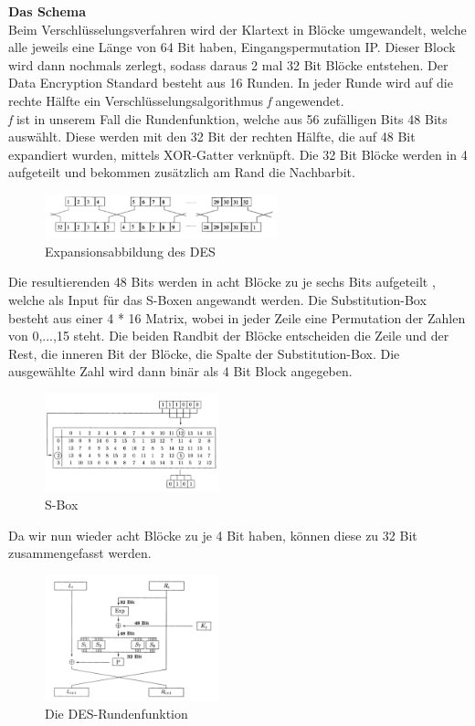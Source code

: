 \documentclass[11pt]{scrartcl}
\begin{document}
\noindent \textbf{Das Schema}\\
Beim Verschlüsselungsverfahren wird der Klartext in Blöcke umgewandelt, welche alle jeweils eine Länge von 64 Bit haben, Eingangspermutation IP. Dieser Block wird dann nochmals zerlegt, sodass daraus 2 mal 32 Bit Blöcke entstehen. Der Data Encryption Standard besteht aus 16 Runden. In jeder Runde wird auf die rechte Hälfte ein Verschlüsselungsalgorithmus \textit{f} angewendet.\\
\textit{f} ist in unserem Fall die Rundenfunktion, welche aus 56 zufälligen Bits 48 Bits auswählt. Diese werden mit den 32 Bit der rechten Hälfte, die auf 48 Bit expandiert wurden, mittels XOR-Gatter verknüpft. Die 32 Bit Blöcke werden in 4 aufgeteilt und bekommen zusätzlich am Rand die Nachbarbit. \\
\begin{figure}[H]
\includegraphics[width=0.60\textwidth]{Bilder/DES/DES_Expansionsabbildung}
	\caption{Expansionsabbildung des DES \citep{2}}
	\label{fig1}
\end{figure}
\noindent \grqq{}Die resultierenden 48 Bits werden in acht Blöcke zu je sechs Bits aufgeteilt\grqq{} \cite{2}, welche als Input für das S-Boxen angewandt werden. Die Substitution-Box besteht aus einer 4 * 16 Matrix, \grqq{}wobei in jeder Zeile eine Permutation der Zahlen von 0,...,15 steht.\grqq{} \citep{2} Die beiden Randbit der Blöcke entscheiden die Zeile und der Rest, die inneren Bit der Blöcke, die Spalte der Substitution-Box. Die ausgewählte Zahl wird dann binär als 4 Bit Block angegeben.\cite{2}
\begin{figure}[H]
\includegraphics[width=0.45\textwidth]{Bilder/DES/S-Box}
	\caption{S-Box\citep{2}}
	\label{fig2}
\end{figure}
\noindent Da wir nun wieder acht Blöcke zu je 4 Bit haben, können diese zu 32 Bit zusammengefasst werden.\cite{2}
\begin{figure}[H]
\includegraphics[width=0.45\textwidth]{Bilder/DES/DES_Rundenfunktion}
	\caption{Die DES-Rundenfunktion \citep{2}}
	\label{fig3}
\end{figure}
\end{document}
